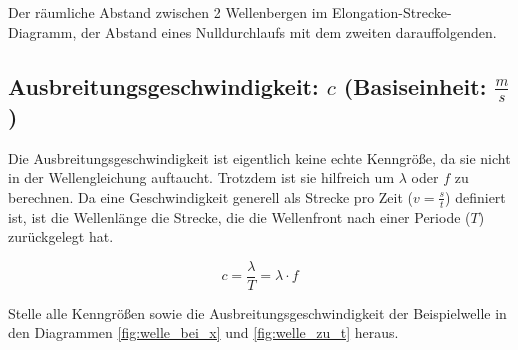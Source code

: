 \noindent Der räumliche Abstand zwischen 2 Wellenbergen im Elongation-Strecke-Diagramm, der Abstand eines Nulldurchlaufs mit dem zweiten darauffolgenden.



\subsection[Ausbreitungsgeschwindigkeit]{Ausbreitungsgeschwindigkeit: $c$ (Basiseinheit: $\frac{m}{s}$)}

\noindent Die Ausbreitungsgeschwindigkeit ist eigentlich keine echte Kenngröße, da sie nicht in der Wellengleichung auftaucht. Trotzdem ist sie hilfreich um $\lambda$ oder $f$ zu berechnen. Da eine Geschwindigkeit generell als Strecke pro Zeit ($v=\frac{s}{t}$) definiert ist, ist die Wellenlänge die Strecke, die die Wellenfront nach einer Periode ($T$) zurückgelegt hat.

\begin{equation} \label{eq:wellen_c}
	c=\frac{\lambda}{T}=\lambda \cdot f
\end{equation}

\begin{Aufgabe}
	Stelle alle Kenngrößen sowie die Ausbreitungsgeschwindigkeit der Beispielwelle in den Diagrammen \ref{fig:welle_bei_x} und  \ref{fig:welle_zu_t} heraus.
\end{Aufgabe}